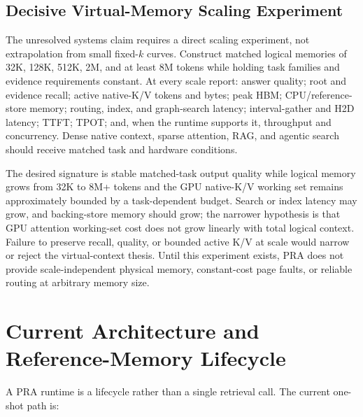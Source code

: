 \documentclass[11pt]{article}
\begin{document}
\subsection{Decisive Virtual-Memory Scaling Experiment}

The unresolved systems claim requires a direct scaling experiment, not extrapolation from small
fixed-$k$ curves.  Construct matched logical memories of 32K, 128K, 512K, 2M, and at least 8M
tokens while holding task families and evidence requirements constant.  At every scale report:
answer quality; root and evidence recall; active native-K/V tokens and bytes; peak HBM;
CPU/reference-store memory; routing, index, and graph-search latency; interval-gather and H2D
latency; TTFT; TPOT; and, when the runtime supports it, throughput and concurrency.  Dense native
context, sparse attention, RAG, and agentic search should receive matched task and hardware
conditions.

The desired signature is stable matched-task output quality while logical memory grows from 32K
to 8M+ tokens and the GPU native-K/V working set remains approximately bounded by a
task-dependent budget.  Search or index latency may grow, and backing-store memory should grow;
the narrower hypothesis is that GPU attention working-set cost does not grow linearly with total
logical context.  Failure to preserve recall, quality, or bounded active K/V at scale would narrow
or reject the virtual-context thesis.  Until this experiment exists, PRA does not provide
scale-independent physical memory, constant-cost page faults, or reliable routing at arbitrary
memory size.

\section{Current Architecture and Reference-Memory Lifecycle}

A PRA runtime is a lifecycle rather than a single retrieval call. The current one-shot path is:
\end{document}
